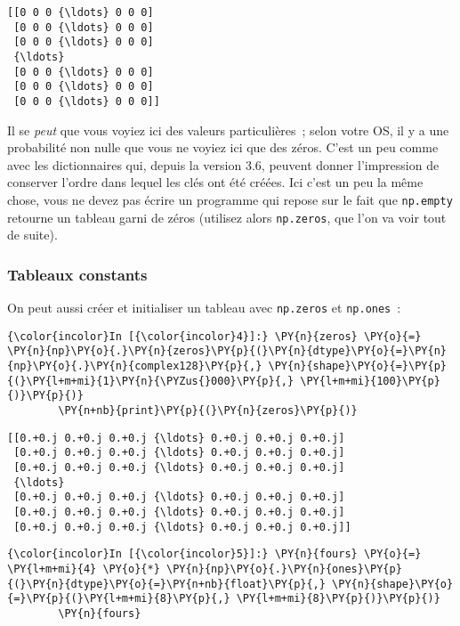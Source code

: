     \begin{Verbatim}[commandchars=\\\{\}]
[[0 0 0 {\ldots} 0 0 0]
 [0 0 0 {\ldots} 0 0 0]
 [0 0 0 {\ldots} 0 0 0]
 {\ldots}
 [0 0 0 {\ldots} 0 0 0]
 [0 0 0 {\ldots} 0 0 0]
 [0 0 0 {\ldots} 0 0 0]]

    \end{Verbatim}

    Il se \emph{peut} que vous voyiez ici des valeurs particulières~; selon
votre OS, il y a une probabilité non nulle que vous ne voyiez ici que
des zéros. C'est un peu comme avec les dictionnaires qui, depuis la
version 3.6, peuvent donner l'impression de conserver l'ordre dans
lequel les clés ont été créées. Ici c'est un peu la même chose, vous ne
devez pas écrire un programme qui repose sur le fait que
\texttt{np.empty} retourne un tableau garni de zéros (utilisez alors
\texttt{np.zeros}, que l'on va voir tout de suite).

    \hypertarget{tableaux-constants}{%
\subsubsection{Tableaux constants}\label{tableaux-constants}}

    On peut aussi créer et initialiser un tableau avec \texttt{np.zeros} et
\texttt{np.ones}~:

    \begin{Verbatim}[commandchars=\\\{\}]
{\color{incolor}In [{\color{incolor}4}]:} \PY{n}{zeros} \PY{o}{=} \PY{n}{np}\PY{o}{.}\PY{n}{zeros}\PY{p}{(}\PY{n}{dtype}\PY{o}{=}\PY{n}{np}\PY{o}{.}\PY{n}{complex128}\PY{p}{,} \PY{n}{shape}\PY{o}{=}\PY{p}{(}\PY{l+m+mi}{1}\PY{n}{\PYZus{}000}\PY{p}{,} \PY{l+m+mi}{100}\PY{p}{)}\PY{p}{)}
        \PY{n+nb}{print}\PY{p}{(}\PY{n}{zeros}\PY{p}{)}
\end{Verbatim}


    \begin{Verbatim}[commandchars=\\\{\}]
[[0.+0.j 0.+0.j 0.+0.j {\ldots} 0.+0.j 0.+0.j 0.+0.j]
 [0.+0.j 0.+0.j 0.+0.j {\ldots} 0.+0.j 0.+0.j 0.+0.j]
 [0.+0.j 0.+0.j 0.+0.j {\ldots} 0.+0.j 0.+0.j 0.+0.j]
 {\ldots}
 [0.+0.j 0.+0.j 0.+0.j {\ldots} 0.+0.j 0.+0.j 0.+0.j]
 [0.+0.j 0.+0.j 0.+0.j {\ldots} 0.+0.j 0.+0.j 0.+0.j]
 [0.+0.j 0.+0.j 0.+0.j {\ldots} 0.+0.j 0.+0.j 0.+0.j]]

    \end{Verbatim}

    \begin{Verbatim}[commandchars=\\\{\}]
{\color{incolor}In [{\color{incolor}5}]:} \PY{n}{fours} \PY{o}{=} \PY{l+m+mi}{4} \PY{o}{*} \PY{n}{np}\PY{o}{.}\PY{n}{ones}\PY{p}{(}\PY{n}{dtype}\PY{o}{=}\PY{n+nb}{float}\PY{p}{,} \PY{n}{shape}\PY{o}{=}\PY{p}{(}\PY{l+m+mi}{8}\PY{p}{,} \PY{l+m+mi}{8}\PY{p}{)}\PY{p}{)}
        \PY{n}{fours}
\end{Verbatim}


